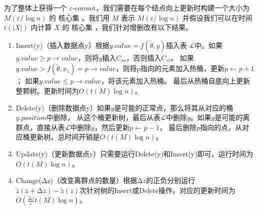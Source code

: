 为了整体上获得一个 $\varepsilon$-coreset，我们需要在每个结点向上更新时构建一个大小为 $M(\varepsilon / \log n)$ 的 核心集 \cite{DBLP:journals/jacm/AgarwalHV04}。我们用 $M$ 表示 $M(\varepsilon / \log n)$ 并假设我们可以在时间 $t(|X|)$ 内计算 $X$ 的 核心集 \cite{DBLP:books/daglib/0035668}，我们针对增删改有以下结果。

\begin{enumerate}
    \item Insert(y)（插入数据点y）根据$y.value=f(\tilde{\theta},y)$插入表
    $\mathcal{L}$中。如果$y.value\geq p\rightarrow value$，则将$y$插入$C_{so}$，否则插入$C_{si}$。
    如果$y.value>f(\tilde{\theta},x_z)=p\rightarrow value$，则将p指向的元素加入热桶，更新$p\leftarrow p+1$；
    如果$y.value\leq p\rightarrow value$，将该元素加入热桶。
    最后从热桶自底向上更新整颗树。更新时间为$O\left(t(M)\log n\right)$。
    \item Delete(y)（删除数据点y）如果$y$是可能的正常点，那么将其从对应的桶$y.position$中删除，
    从这个桶更新树，最后从表$\mathcal{L}$中删除$y$。如果$y$是可能的离群点，直接从表$\mathcal{L}$中删除$y$，然后更新$p\leftarrow p-1$，
    最后删除$p$指向的点，从对应桶更新树。总时间开销是$O\left(t(M)\log n\right)$。
    \item Update(y)（更新数据点y）只需要运行Delete(y)和Insert(y)即可，运行时间为$O\left(t(M)\log n\right)$。
    \item Change($\increment$z)（改变离群点的数量）根据$\increment z$的正负分别运行$\tilde{z}(z+\increment z)-\tilde{z}(z)$次针对树的Insert或Delete操作。对应的更新时间为$O\left(\frac{\increment z}{\varepsilon}t(M)\log n\right)$。
\end{enumerate}

